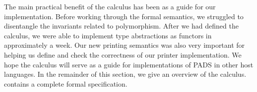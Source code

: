 The main practical benefit of the calculus has been as a guide for our
implementation. Before working through the formal semantics, we
struggled to disentangle the invariants related to polymorphism. After
we had defined the calculus, we were able to implement type
abstractions as \ocaml{} functors in approximately a week.  
Our new printing semantics was also very important for helping us define
and check the correctness of our printer implementation.  We hope
the calculus will serve as a guide for implementations of {\sc PADS} in
other host languages.
In the remainder of this section, we give an overview of the calculus.
 contains a complete formal specification.





